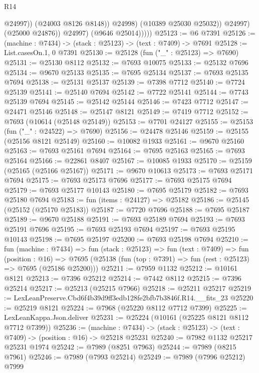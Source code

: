 \begin{lexlean}{R14}
\begin{coremodule}
                            @24997))
                        (@24003 @8126 @8148))
                      @24998)
                    (@10389 @25030 @25032))
                  @24997)
                (@25000 @24876))
              @24997)
            (@9646 @25014)))))
@25123 := @6 @7391
@25126 := (machine : @7434) -> (stack : @25123) -> (text : @7409) -> @7691
@25128 := List.casesOn.{1, 0} @7391
@25130 := @25128 (fun ("_" : @25123) => @7690)
@25131 := @25130 @8112
@25132 := @7693 @10075
@25133 := @25132 @7696
@25134 := @9670 @25133
@25135 := @7695 @25134
@25137 := @7693 @25135 @7694
@25138 := @25131 @25137
@25139 := @7398 @7712
@25140 := @7724 @25139
@25141 := @25140 @7694
@25142 := @7722 @25141
@25144 := @7743 @25139 @7694
@25145 := @25142 @25144
@25146 := @7423 @7712
@25147 := @24471 @25146
@25148 := @25147 @8121
@25149 := @7419 @7712
@25152 := @7693 (@10614 (@25148 @25149))
@25153 := @7701 @24127
@25155 := @25153 (fun ("_" : @24522) => @7690)
@25156 := @24478 @25146
@25159 := @25155 (@25156 @8121 @25149)
@25160 := @10082 @1933
@25161 := @9670 @25160
@25163 := @7693 @25161 @7694
@25164 := @7695 @25163
@25165 := @7693 @25164
@25166 := @22861 @8407
@25167 := @10085 @1933
@25170 := @25159 (@25165 (@25166 @25167))
@25171 := @9670 @10613
@25173 := @7693 @25171 @7694
@25175 := @7693 @25173 @7696
@25177 := @7693 @25175 @7694
@25179 := @7693 @25177 @10143
@25180 := @7695 @25179
@25182 := @7693 @25180 @7694
@25183 := fun (items : @24127) => @25182
@25186 := @25145 (@25152 (@25170 @25183))
@25187 := @7720 @7696
@25188 := @7695 @25187
@25189 := @9670 @25188
@25191 := @7693 @25189 @7694
@25193 := @7693 @25191 @7696
@25195 := @7693 @25193 @7694
@25197 := @7693 @25195 @10143
@25198 := @7695 @25197
@25200 := @7693 @25198 @7694
@25210 := fun (machine : @7434) =>
  fun (stack : @25123) =>
  fun (text : @7409) =>
  fun (position : @16) =>
  @7695 (@25138 (fun (top : @7391) => fun (rest : @25123) => @7695 (@25186 @25200)))
@25211 := @7959 @1132
@25212 := @10161 @8121
@25213 := @7396 @25212
@25214 := @7442 @8112
@25215 := @7396 @25214
@25217 := @25213 (@25215 @7966)
@25218 := @25211 @25217
@25219 := LexLeanPreserve.Cbd6f4b39d9ff3edb128fe2bfb7b3846f.R14.__fits_23
@25220 := @25219 @8121
@25224 := @7968 (@25220 @8112 @7712 @7399)
@25225 := LexLeanKappa.Json.deliver
@25231 := @25224 (@10161 (@25225 @8121 @8112 @7712 @7399))
@25236 := (machine : @7434) ->
  (stack : @25123) -> (text : @7409) -> (position : @16) -> @25218 @25231
@25240 := @7982 @1132 @25217 @25231 @1974
@25242 := @7989 (@8251 @7963)
@25244 := @7989 (@8215 @7961)
@25246 := @7989 (@7993 @25214)
@25249 := @7989 (@7996 @25212) @7999

\end{coremodule}
\end{lexlean}
